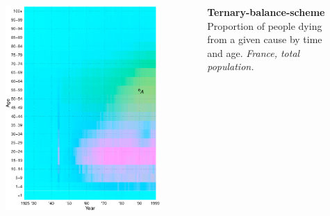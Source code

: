 \documentclass{beamer}
\begin{document}
\begin{frame}
\frametitle{\insertsection}

\begin{columns}[c]

\begin{figure}[htb!]
\includegraphics[width = 0.97\textwidth]{./fig/tern_balance_no_lgnd.pdf}
\end{figure}

\small \textbf{Ternary-balance-scheme}\\ Proportion of people dying from a given cause by time and age. \scriptsize\emph{France, total population.}


\end{columns}
\end{frame}
\end{document}
